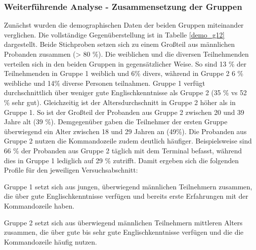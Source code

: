 \subsubsection{Weiterführende Analyse - Zusammensetzung der Gruppen}
Zunächst wurden die demographischen Daten der beiden Gruppen miteinander verglichen. Die vollständige Gegenüberstellung ist in Tabelle \ref{demo_g12} dargestellt. Beide Stichproben setzen sich zu einem Großteil aus männlichen Probanden zusammen (> 80 \%). Die weiblichen und die diversen Teilnehmenden verteilen sich in den beiden Gruppen in gegensätzlicher Weise. So sind 13 \% der Teilnehmenden in Gruppe 1 weiblich und 6\% divers, während in Gruppe 2 6 \% weibliche und 14\% diverse Personen teilnahmen. Gruppe 1 verfügt durchschnittlich über weniger gute Englischkenntnisse als Gruppe 2 (35 \% vs 52 \% sehr gut). Gleichzeitig ist der Altersdurchschnitt in Gruppe 2 höher als in Gruppe 1. So ist der Großteil der Probanden aus Gruppe 2 zwischen 20 und 39 Jahre alt (39 \%). Demgegenüber gaben die Teilnehmer der ersten Gruppe überwiegend ein Alter zwischen 18 und 29 Jahren an (49\%). Die Probanden aus Gruppe 2 nutzen die Kommandozeile zudem deutlich häufiger. Beispielsweise sind 66 \% der Probanden aus Gruppe 2  täglich mit dem Terminal befasst, während dies in Gruppe 1 lediglich auf 29 \% zutrifft. Damit ergeben sich die folgenden Profile für den jeweiligen Versuchsabschnitt:

Gruppe 1 setzt sich aus jungen, überwiegend männlichen Teilnehmern zusammen, die über gute Englischkenntnisse verfügen und bereits erste Erfahrungen mit der Kommandozeile haben. 

Gruppe 2 setzt sich aus überwiegend männlichen Teilnehmern mittleren Alters zusammen, die über gute bis sehr gute Englischkenntnisse verfügen und die die Kommandozeile häufig nutzen. 

